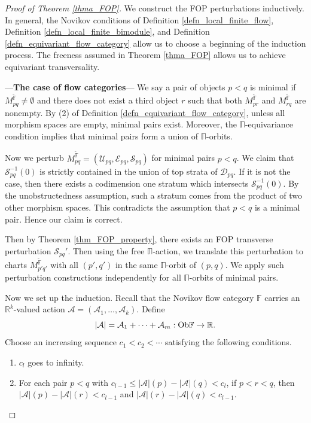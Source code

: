 \documentclass[reqno, 10pt]{amsart}
\numberwithin{equation}{section}
\numberwithin{equation}{section}
\theoremstyle{definition}
\theoremstyle{remark}
\newcommand{\beqn}{\begin{equation*}}
\newcommand{\eeqn}{\end{equation*}}
\newcommand{\mb}{\mathbb}
\newcommand{\mc}{\mathcal}
\begin{document}
\begin{proof}[Proof of Theorem \ref{thma_FOP}]

We construct the FOP perturbations inductively. In general, the Novikov conditions of Definition \ref{defn_local_finite_flow}, Definition \ref{defn_local_finite_bimodule}, and Definition \ref{defn_equivariant_flow_category} allow us to choose a beginning of the induction process. The freeness assumed in Theorem \ref{thma_FOP} allows us to achieve equivariant transversality.

---{\bf The case of flow categories}--- We say a pair of objects $p<q$ is minimal if $M_{pq}^{\tilde{\mb F}} \neq \emptyset$ and there does not exist a third object $r$ such that both $M_{pr}^{\tilde {\mb F}}$ and $M_{rq}^{\tilde {\mb F}}$ are nonempty. By (2) of Definition \ref{defn_equivariant_flow_category}, unless all morphism spaces are empty, minimal pairs exist. Moreover, the $\mb\Pi$-equivariance condition implies that minimal pairs form a union of $\mb\Pi$-orbits. 

Now we perturb $M_{pq}^{\tilde {\mb F}} = ({\mc U}_{pq}, {\mc E}_{pq}, {\mc S}_{pq})$ for minimal pairs $p<q$. We claim that ${\mc S}_{pq}^{-1}(0)$ is strictly contained in the union of top strata of ${\mc D}_{pq}$. If it is not the case, then there exists a codimension one stratum which intersects ${\mc S}_{pq}^{-1}(0)$. By the unobstructedness assumption, such a stratum comes from the product of two other morphism spaces. This contradicts the assumption that $p<q$ is a minimal pair. Hence our claim is correct. 

Then by Theorem \ref{thm_FOP_property}, there exists an FOP transverse perturbation ${\mc S}_{pq}'$. Then using the free $\mb\Pi$-action, we translate this perturbation to charts $M_{p'q'}^{\tilde{\mb F}}$ with all $(p', q')$ in the same $\mb\Pi$-orbit of $(p, q)$. We apply such perturbation constructions independently for all $\mb\Pi$-orbits of minimal pairs. 

Now we set up the induction. Recall that the Novikov flow category ${\mb F}$ carries an ${\mb R}^k$-valued action ${\mc A} = ({\mc A}_1, \ldots, {\mc A}_k)$. Define
\beqn
|{\mc A}| = {\mc A}_1 + \cdots + {\mc A}_m: {\rm Ob}{\mb F} \to {\mb R}.
\eeqn
Choose an increasing sequence $c_1 < c_2 < \cdots$ satisfying the following conditions.
\begin{enumerate}

    \item $c_l$ goes to infinity.

    \item For each pair $p<q$ with $c_{l-1} \leq |{\mc A}|(p) - |{\mc A}| (q) < c_l$, if $p<r<q$, then $|{\mc A}| (p) - |{\mc A}|(r) < c_{l-1}$ and $|{\mc A}| (r) - |{\mc A}| (q) < c_{l-1}$. 


\end{enumerate}
\end{proof}
\end{document}
